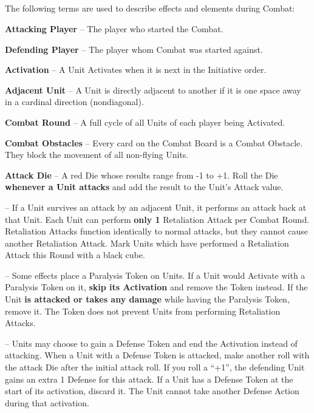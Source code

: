 \begin{multicols*}{2}
\subsection*{}
The following terms are used to describe effects and elements during Combat:\par
\textbf{Attacking Player} – The player who started the Combat.\par
\textbf{Defending Player} – The player whom Combat was started against.\par
\textbf{Activation} – A Unit Activates when it is next in the Initiative order.\par
\textbf{Adjacent Unit} – A Unit is directly adjacent to another if it is one space away in a cardinal direction (nondiagonal).\par
\textbf{Combat Round} – A full cycle of all Units of each player being Activated.\par
\textbf{Combat Obstacles} – Every card on the Combat Board is a Combat Obstacle.
They block the movement of all non-flying Units.\smallskip\par
{}\parbox{0.7\hsize}{\textbf{Attack Die} – A red Die whose results range from -1 to +1.
Roll the Die \textbf{whenever a Unit attacks} and
add the result to the Unit's Attack value.}\par\smallskip
\textbf{} – If a Unit survives an attack by an adjacent Unit, it performs an attack back at that Unit.
Each Unit can perform \textbf{only 1} Retaliation Attack per Combat Round.
Retaliation Attacks function identically to normal attacks, but they cannot cause another Retaliation Attack.
Mark Units which have performed a Retaliation Attack this Round with a black cube.\par
\textbf{}  – Some effects place a Paralysis Token on Units.
If a Unit would Activate with a Paralysis Token on it, \textbf{skip its Activation} and remove the Token instead.
If the Unit \textbf{is attacked or takes any damage} while having the Paralysis Token, remove it.
The Token does not prevent Units from performing Retaliation Attacks.\par
\textbf{}  – Units may choose to gain a Defense Token and end the Activation instead of attacking.
When a Unit with a Defense Token is attacked, make another roll with the attack Die after the initial attack roll.
If you roll a ``+1'', the defending Unit gains an extra 1 Defense for this attack.
If a Unit has a Defense Token at the start of its activation, discard it.
The Unit cannot take another Defense Action during that activation.


\end{multicols*}
